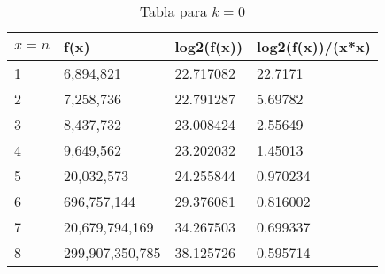 \begin{table}[H]
\parbox{0.3\textwidth}{
  \begin{tabular}{| l | l | l | l |}
    \hline
    $x=n$ & f(x) & log2(f(x)) & log2(f(x))/(x*x) 	\\ \hline
    1	&6,894,821	&22.717082	&22.7171 			\\ \hline
    2	&7,258,736	&22.791287	&5.69782 			\\ \hline
    3	&8,437,732	&23.008424	&2.55649 			\\ \hline
    4	&9,649,562	&23.202032	&1.45013 			\\ \hline
    5	&20,032,573	&24.255844	&0.970234 			\\ \hline
    6	&696,757,144	&29.376081	&0.816002 		\\ \hline
    7	&20,679,794,169	&34.267503	&0.699337 		\\ \hline
    8	&299,907,350,785	&38.125726	&0.595714 	\\ \hline
  \end{tabular}
  \caption*{Tabla para $k=0$}
}
\end{table}

